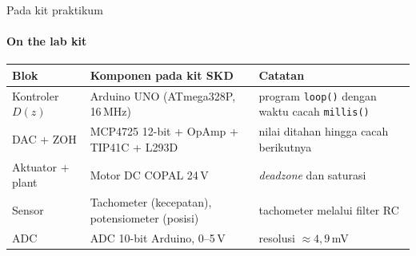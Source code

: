 \documentclass[aspectratio=169,10pt]{beamer}
\begin{document}
\begin{frame}{Pada kit praktikum}
	\framesubtitle{On the lab kit}
	\footnotesize
	\renewcommand{\arraystretch}{1.3}
	\begin{tabular}{@{}p{2.3cm} p{6.0cm} p{4.9cm}@{}}
		\toprule
		\textbf{Blok} & \textbf{Komponen pada kit SKD} & \textbf{Catatan} \\
		\midrule
		Kontroler $D(z)$ & Arduino UNO (ATmega328P, 16\,MHz) & program \texttt{loop()} dengan waktu cacah \texttt{millis()} \\
		DAC + ZOH & MCP4725 12-bit + OpAmp + TIP41C + L293D & nilai ditahan hingga cacah berikutnya \\
		Aktuator + plant & Motor DC COPAL 24\,V & \textit{deadzone} dan saturasi \\
		Sensor & Tachometer (kecepatan), potensiometer (posisi) & tachometer melalui filter RC \\
		ADC & ADC 10-bit Arduino, 0--5\,V & resolusi $\approx 4{,}9$\,mV \\
		\bottomrule
	\end{tabular}

	\vspace{0.4cm}
\end{frame}
\end{document}
